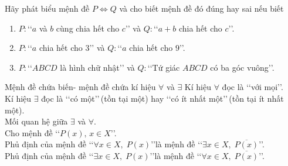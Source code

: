 \begin{bt}
	Hãy phát biểu mệnh đề $P\Leftrightarrow Q$ và cho biết mệnh đề đó đúng hay sai nếu biết
	\begin{enumerate}
		\item $P\colon $\lq\lq  $a$ và $b$ cùng chia hết cho $c$\rq\rq\text{} và $Q\colon $\lq\lq  $a+b$ chia hết cho $c$\rq\rq.
		\item $P\colon $\lq\lq  $a$ chia hết cho $3$\rq\rq\text{} và $Q\colon $\lq\lq  $a$ chia hết cho $9$\rq\rq.
		\item $P\colon $\lq\lq  $ABCD$ là hình chữ nhật\rq\rq\text{} và $Q\colon $\lq\lq  Tứ giác $ABCD$ có ba góc vuông\rq\rq.
	\end{enumerate}
\end{bt}

\begin{dang}{Mệnh đề chứa biến- mệnh đề chứa kí hiệu $\forall$ và $\exists$}
	Kí hiệu $\forall$ đọc là \lq \lq với mọi\rq \rq.\\
	Kí hiệu $\exists$ đọc là \lq \lq có một\rq \rq \,(tồn tại một) hay \lq \lq có ít nhất một\rq \rq\,(tồn tại ít nhất một).\\
	Mối quan hệ giữa $\exists$ và $\forall$.\\
	Cho mệnh đề \lq \lq $P(x),\, x \in X$\rq \rq.\\
	Phủ định của mệnh đề \lq \lq $ \forall x \in X,\;P(x)$\rq \rq \;là mệnh đề \lq \lq $\exists x \in X,\;\overline{P(x)}$\rq \rq.\\
	Phủ định của mệnh đề \lq \lq $ \exists x \in X,\;P(x)$\rq \rq \;là mệnh đề \lq \lq $ \forall x \in X,\;\overline{P(x)}$\rq \rq.
\end{dang}

